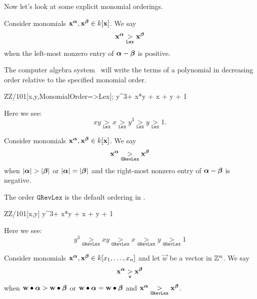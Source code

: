 \documentclass{ximera}
\begin{document}
Now let's look at some explicit monomial orderings.


\begin{definition}
  Consider monomials $\mathbf{x}^{\boldsymbol\alpha},\mathbf{x}^{\boldsymbol\beta}\in k[\mathbf{x}]$. We say
  \[
  \mathbf{x}^{\boldsymbol\alpha} \underset{\mathtt{Lex}}{>}\mathbf{x}^{\boldsymbol\beta}
  \]
  when the left-most nonzero entry of ${\boldsymbol\alpha}-{\boldsymbol\beta}$ is positive.
\end{definition}

The computer algebra system \macaulay\ will write the terms of a
polynomial in decreasing order relative to the specified monomial
order.

\begin{macaulay2}
ZZ/101[x,y,MonomialOrder=>Lex];
y^3+ x*y + x + y + 1
\end{macaulay2}

Here we see:
\[
xy \underset{\mathtt{Lex}}{>} x \underset{\mathtt{Lex}}{>} y^3
\underset{\mathtt{Lex}}{>} y \underset{\mathtt{Lex}}{>} 1.
\]



\begin{definition}
  Consider monomials $\mathbf{x}^{\boldsymbol\alpha},\mathbf{x}^{\boldsymbol\beta}\in k[\mathbf{x}]$. We say
  \[
  \mathbf{x}^{\boldsymbol\alpha} \underset{\mathtt{GRevLex}}{>}\mathbf{x}^{\boldsymbol\beta}
  \]
  when $|{\boldsymbol\alpha}| > |{\boldsymbol\beta}|$ or $|{\boldsymbol\alpha}| = |{\boldsymbol\beta}|$ and the
  right-most nonzero entry of ${\boldsymbol\alpha}-{\boldsymbol\beta}$ is negative.
\end{definition}

The order $\mathtt{GRevLex}$ is the default ordering in \macaulay.

\begin{macaulay2}
ZZ/101[x,y]
y^3+ x*y + x + y + 1
\end{macaulay2}

Here we see:
\[
y^3 \underset{\mathtt{GRevLex}}{>} xy \underset{\mathtt{GRevLex}}{>} x  \underset{\mathtt{GRevLex}}{>} y \underset{\mathtt{GRevLex}}{>} 1
\]

\begin{definition}
  Consider monomials $\mathbf{x}^{\boldsymbol\alpha},\mathbf{x}^{\boldsymbol\beta}\in k[x_1,\dots, x_n]$ and
  let $\vec{w}$ be a vector in $\mathbb Z^n$. We say
  \[
  \mathbf{x}^{\boldsymbol\alpha} \underset{\mathtt{w}}{>}\mathbf{x}^{\boldsymbol\beta}
  \]
  when $\mathbf{w}\bullet {\boldsymbol\alpha} > \mathbf{w}\bullet {\boldsymbol\beta}$ or $\mathbf{w}\bullet
  {\boldsymbol\alpha} = \mathbf{w}\bullet {\boldsymbol\beta}$ and $\mathbf{x}^{\boldsymbol\alpha}
  \underset{\mathtt{GRevLex}}{>}\mathbf{x}^{\boldsymbol\beta}$.
\end{definition}
\end{document}
